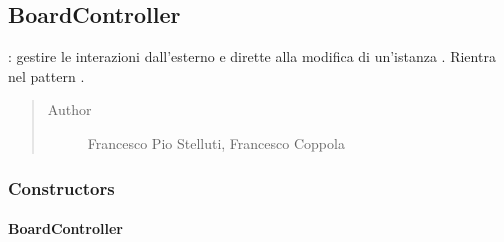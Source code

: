 \documentclass[letterpaper,10pt,italian,openany,oneside]{sphinxmanual}
\begin{document}
\label{\detokenize{source/it/unicam/cs/pa/mastermind/gamecore/package-index:package-it.unicam.cs.pa.mastermind.gamecore}}

\subsection{BoardController}
\label{\detokenize{source/it/unicam/cs/pa/mastermind/gamecore/BoardController:boardcontroller}}\label{\detokenize{source/it/unicam/cs/pa/mastermind/gamecore/BoardController::doc}}

\begin{fulllineitems}
\label{\detokenize{source/it/unicam/cs/pa/mastermind/gamecore/BoardController:it.unicam.cs.pa.mastermind.gamecore.BoardController}}
: gestire le interazioni dall’esterno e dirette alla modifica di un’istanza . Rientra nel pattern .
\begin{quote}\begin{description}
\item[{Author}] \leavevmode
Francesco Pio Stelluti, Francesco Coppola

\end{description}\end{quote}

\end{fulllineitems}



\subsubsection{Constructors}
\label{\detokenize{source/it/unicam/cs/pa/mastermind/gamecore/BoardController:constructors}}

\paragraph{BoardController}
\label{\detokenize{source/it/unicam/cs/pa/mastermind/gamecore/BoardController:id1}}
\end{document}
